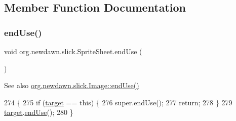 \subsection{Member Function Documentation}
\mbox{\label{classorg_1_1newdawn_1_1slick_1_1_sprite_sheet_aa265f92f608b1241b93aad81779d8826}} 
\subsubsection{\texorpdfstring{end\+Use()}{endUse()}}
{\footnotesize\ttfamily void org.\+newdawn.\+slick.\+Sprite\+Sheet.\+end\+Use (\begin{DoxyParamCaption}{ }\end{DoxyParamCaption})\hspace{0.3cm}{\ttfamily [inline]}}

\begin{DoxySeeAlso}{See also}
\mbox{\hyperlink{classorg_1_1newdawn_1_1slick_1_1_image_a2506df1ee54d606232317b20c29b6db5}{org.\+newdawn.\+slick.\+Image\+::end\+Use()}} 
\end{DoxySeeAlso}

\begin{DoxyCode}
274                          \{
275         \textcolor{keywordflow}{if} (\mbox{\hyperlink{classorg_1_1newdawn_1_1slick_1_1_sprite_sheet_a54e0b09e9140db02bc11ac22fff5d464}{target}} == \textcolor{keyword}{this}) \{
276             super.endUse();
277             \textcolor{keywordflow}{return};
278         \}
279         \mbox{\hyperlink{classorg_1_1newdawn_1_1slick_1_1_sprite_sheet_a54e0b09e9140db02bc11ac22fff5d464}{target}}.\mbox{\hyperlink{classorg_1_1newdawn_1_1slick_1_1_image_a2506df1ee54d606232317b20c29b6db5}{endUse}}();
280     \}
\end{DoxyCode}
\mbox{\label{classorg_1_1newdawn_1_1slick_1_1_sprite_sheet_ad27a155a90551c1a233dae5d4b2c1d92}} 
